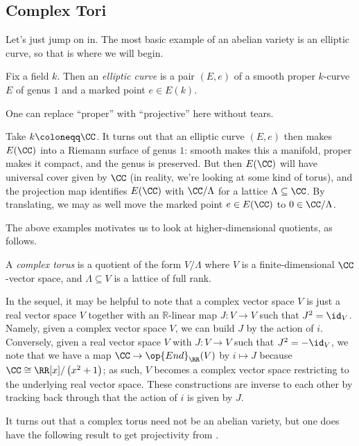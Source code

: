 \documentclass[../notes.tex]{subfiles}
\begin{document}
\subsection{Complex Tori}
Let's just jump on in. The most basic example of an abelian variety is an elliptic curve, so that is where we will begin.
\begin{definition}
	Fix a field $k$. Then an \textit{elliptic curve} is a pair $(E,e)$ of a smooth proper $k$-curve $E$ of genus $1$ and a marked point $e\in E(k)$.
\end{definition}
\begin{remark}
	One can replace ``proper'' with ``projective'' here without tears.
\end{remark}
\begin{example}
	Take $k\coloneqq\CC$. It turns out that an elliptic curve $(E,e)$ then makes $E(\CC)$ into a Riemann surface of genus $1$: smooth makes this a manifold, proper makes it compact, and the genus is preserved. But then $E(\CC)$ will have universal cover given by $\CC$ (in reality, we're looking at some kind of torus), and the projection map identifies $E(\CC)$ with $\CC/\Lambda$ for a lattice $\Lambda\subseteq\CC$. By translating, we may as well move the marked point $e\in E(\CC)$ to $0\in\CC/\Lambda$.
\end{example}
The above examples motivates us to look at higher-dimensional quotients, as follows.
\begin{definition}
	A \textit{complex torus} is a quotient of the form $V/\Lambda$ where $V$ is a finite-dimen\-sional $\CC$-vector space, and $\Lambda\subseteq V$ is a lattice of full rank.
\end{definition}
\begin{remark}
	In the sequel, it may be helpful to note that a complex vector space $V$ is just a real vector space $V$ together with an $\mathbb R$-linear map $J\colon V\to V$ such that $J^2=\id_V$. Namely, given a complex vector space $V$, we can build $J$ by the action of $i$. Conversely, given a real vector space $V$ with $J\colon V\to V$ such that $J^2=-\id_V$, we note that we have a map $\CC\to\op{End}_\RR(V)$ by $i\mapsto J$ because $\CC\cong\RR[x]/\left(x^2+1\right)$; as such, $V$ becomes a complex vector space restricting to the underlying real vector space. These constructions are inverse to each other by tracking back through that the action of $i$ is given by $J$.
\end{remark}
It turns out that a complex torus need not be an abelian variety, but one does have the following result to get projectivity from \cite[I.3, p.~33]{mumford}.
\end{document}
